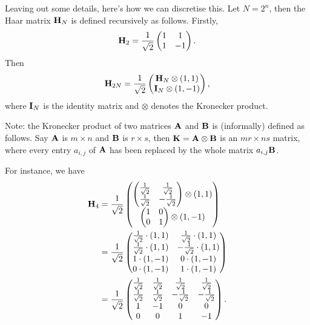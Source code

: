 \documentclass[a4paper, 11pt, openany]{book}
\numberwithin{equation}{section}
\theoremstyle{plain}
\theoremstyle{definition}
\begin{document}
Leaving out some details, here's how we can discretise this. Let $N = 2^n$, then the Haar matrix ${\bf H}_N$ is defined recursively as follows. Firstly,
\[
    {\bf H}_2 = \frac{1}{\sqrt{2}} \begin{pmatrix}
    1 & 1\\
    1 & -1
    \end{pmatrix}.
\]
Then
\[
    {\bf H}_{2N} = \frac{1}{\sqrt{2}} \begin{pmatrix}
    {\bf H}_N  \otimes (1,1)\\
    {\bf I}_N \otimes (1,-1)
    \end{pmatrix},
\]
where ${\bf I}_N$ is the identity matrix and $\otimes$ denotes the Kronecker product.

Note: the Kronecker product of two matrices ${\bf A}$ and ${\bf B}$ is (informally) defined as follows. Say ${\bf A}$ is $m \times n$ and ${\bf B}$ is $r \times s$, then ${\bf K} = {\bf A} \otimes {\bf B}$ is an $mr \times ns$ matrix, where every entry $a_{i,j}$ of ${\bf A}$ has been replaced by the whole matrix $a_{i,j}{\bf B}$.

For instance, we have
\begin{align*}
    {\bf H}_4 &= \frac{1}{\sqrt{2}} \begin{pmatrix}
     \begin{pmatrix}
    \frac{1}{\sqrt{2}} & \frac{1}{\sqrt{2}}\\
    \frac{1}{\sqrt{2}} & -\frac{1}{\sqrt{2}}
    \end{pmatrix} \otimes (1,1)\\
    \begin{pmatrix}
    1 & 0\\
    0 & 1
    \end{pmatrix} \otimes (1, -1)
    \end{pmatrix}\\
    &= \frac{1}{\sqrt{2}} \begin{pmatrix}
    \frac{1}{\sqrt{2}} \cdot (1,1) & \frac{1}{\sqrt{2}} \cdot (1,1)\\
    \frac{1}{\sqrt{2}} \cdot (1,1) & -\frac{1}{\sqrt{2}} \cdot (1,1)\\
    1 \cdot (1, -1) & 0 \cdot (1, -1)\\
    0 \cdot (1, -1) & 1 \cdot (1, -1)
    \end{pmatrix}\\
    &= \frac{1}{ \sqrt{2} } \begin{pmatrix}
    \frac{1}{\sqrt{2}}           & \frac{1}{\sqrt{2}}         & \frac{1}{\sqrt{2}}         & \frac{1}{\sqrt{2}}\\
    \frac{1}{\sqrt{2}}           & \frac{1}{\sqrt{2}}         & -\frac{1}{\sqrt{2}}        & -\frac{1}{\sqrt{2}}\\
    1    & -1 & 0         & 0\\
    0           & 0         & 1  & -1
    \end{pmatrix}.
\end{align*}
\end{document}
